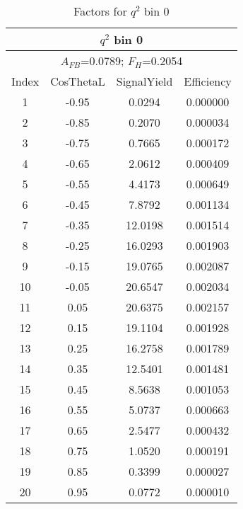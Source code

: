 \begin{table*}[htbH]
  \begin{center}
  \caption{Factors for $q^2$ bin 0 
  \label{tab:factors_bin0}}
  \small
  \begin{tabular}{|c||c|c|c|}
    \hline
    \multicolumn{4}{|c|}{$q^2$ bin 0} \\ 
    \hline
    \multicolumn{4}{|c|}{$A_{FB}$=0.0789;   $F_{H}$=0.2054} \\ 
    \hline
    Index & CosThetaL & SignalYield & Efficiency \\ 
    \hline
    1 & -0.95 & 0.0294 & 0.000000 \\ 
    2 & -0.85 & 0.2070 & 0.000034 \\ 
    3 & -0.75 & 0.7665 & 0.000172 \\ 
    4 & -0.65 & 2.0612 & 0.000409 \\ 
    5 & -0.55 & 4.4173 & 0.000649 \\ 
    6 & -0.45 & 7.8792 & 0.001134 \\ 
    7 & -0.35 & 12.0198 & 0.001514 \\ 
    8 & -0.25 & 16.0293 & 0.001903 \\ 
    9 & -0.15 & 19.0765 & 0.002087 \\ 
    10 & -0.05 & 20.6547 & 0.002034 \\ 
    11 & 0.05 & 20.6375 & 0.002157 \\ 
    12 & 0.15 & 19.1104 & 0.001928 \\ 
    13 & 0.25 & 16.2758 & 0.001789 \\ 
    14 & 0.35 & 12.5401 & 0.001481 \\ 
    15 & 0.45 & 8.5638 & 0.001053 \\ 
    16 & 0.55 & 5.0737 & 0.000663 \\ 
    17 & 0.65 & 2.5477 & 0.000432 \\ 
    18 & 0.75 & 1.0520 & 0.000191 \\ 
    19 & 0.85 & 0.3399 & 0.000027 \\ 
    20 & 0.95 & 0.0772 & 0.000010 \\ 
    \hline
  \end{tabular}
  \end{center}
\end{table*}


